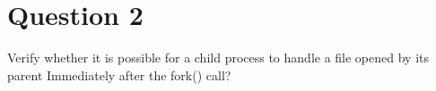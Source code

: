 \documentclass[main.tex]{subfiles}
\begin{document}
\section{Question 2}

Verify whether it is possible for a child process to handle a file opened by its
parent Immediately after the fork() call?



\end{document}
